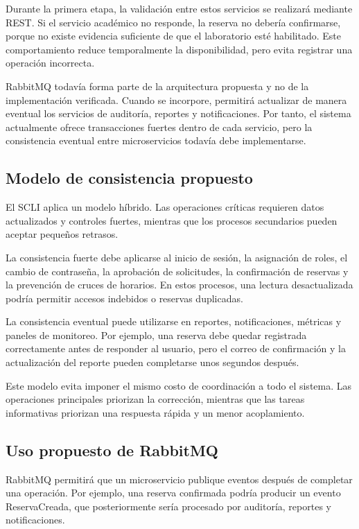 \documentclass[conference]{IEEEtran}
\begin{document}
Durante la primera etapa, la validación entre estos servicios se realizará mediante REST. Si el servicio académico no responde, la reserva no debería confirmarse, porque no existe evidencia suficiente de que el laboratorio esté habilitado. Este comportamiento reduce temporalmente la disponibilidad, pero evita registrar una operación incorrecta.

RabbitMQ todavía forma parte de la arquitectura propuesta y no de la implementación verificada. Cuando se incorpore, permitirá actualizar de manera eventual los servicios de auditoría, reportes y notificaciones. Por tanto, el sistema actualmente ofrece transacciones fuertes dentro de cada servicio, pero la consistencia eventual entre microservicios todavía debe implementarse.

\subsection{Modelo de consistencia propuesto}
El SCLI aplica un modelo híbrido. Las operaciones críticas requieren datos actualizados y controles fuertes, mientras que los procesos secundarios pueden aceptar pequeños retrasos.

La consistencia fuerte debe aplicarse al inicio de sesión, la asignación de roles, el cambio de contraseña, la aprobación de solicitudes, la confirmación de reservas y la prevención de cruces de horarios. En estos procesos, una lectura desactualizada podría permitir accesos indebidos o reservas duplicadas.

La consistencia eventual puede utilizarse en reportes, notificaciones, métricas y paneles de monitoreo. Por ejemplo, una reserva debe quedar registrada correctamente antes de responder al usuario, pero el correo de confirmación y la actualización del reporte pueden completarse unos segundos después.

Este modelo evita imponer el mismo costo de coordinación a todo el sistema. Las operaciones principales priorizan la corrección, mientras que las tareas informativas priorizan una respuesta rápida y un menor acoplamiento.

\subsection{Uso propuesto de RabbitMQ}
RabbitMQ permitirá que un microservicio publique eventos después de completar una operación. Por ejemplo, una reserva confirmada podría producir un evento ReservaCreada, que posteriormente sería procesado por auditoría, reportes y notificaciones.
\end{document}
